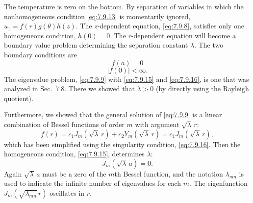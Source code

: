 The temperature is zero on the bottom.  By separation of variables in which the nonhomogeneous condition \eqref{eq:7.9.13} is momentarily ignored, $u_1 = f(r)g(\theta)h(z)$.  The $z$-dependent equation, \eqref{eq:7.9.8}, satisfies only one homogeneous condition, $h(0) = 0$.  The $r$-dependent equation will become a boundary value problem determining the separation constant $\lambda$.  The two boundary conditions are
\begin{equation}
f(a) = 0
\label{eq:7.9.15}
\end{equation}
\begin{equation}
|f(0)| < \infty.
\label{eq:7.9.16}
\end{equation}
The eigenvalue problem, \eqref{eq:7.9.9} with \eqref{eq:7.9.15} and \eqref{eq:7.9.16}, is one that was analyzed in Sec.~7.8.  There we showed that $\lambda > 0$ (by directly using the Rayleigh quotient).

Furthermore, we showed that the general solution of \eqref{eq:7.9.9} is a linear combination of Bessel functions of order $m$ with argument $\sqrt{\lambda}\,r$:
\begin{equation}
f(r) = c_1 J_m\left(\sqrt{\lambda}\,r\right) + c_2 Y_m\left(\sqrt{\lambda}\,r\right) = c_1 J_m\left(\sqrt{\lambda}\,r\right),
\label{eq:7.9.17}
\end{equation}
which has been simplified using the singularity condition, \eqref{eq:7.9.16}.  Then the homogeneous condition, \eqref{eq:7.9.15}, determines $\lambda$:
\begin{equation}
\boxed{J_m\left(\sqrt{\lambda}\,a\right) = 0.}
\label{eq:7.9.18}
\end{equation}
Again $\sqrt{\lambda}\,a$ must be a zero of the $m$th Bessel function, and the notation $\lambda_{mn}$ is used to indicate the infinite number of eigenvalues for each $m$.  The eigenfunction $J_m\left(\sqrt{\lambda_{mn}}\,r\right)$ oscillates in $r$.

